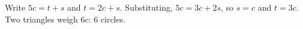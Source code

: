 Write $5c=t+s$ and $t=2c+s$. Substituting, $5c=3c+2s$, so $s=c$ and $t=3c$. Two triangles weigh $6c$: $\boxed{6}$ circles.
